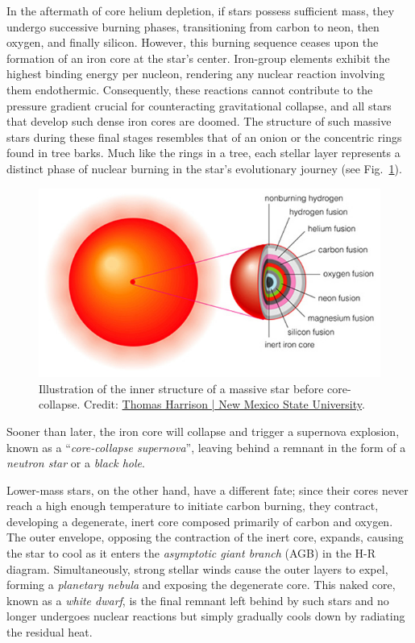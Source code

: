 \documentclass[main.tex]{subfiles}
\begin{document}
    In the aftermath of core helium depletion, if stars possess sufficient mass, they undergo successive burning phases, transitioning from carbon to neon, then oxygen, and finally silicon. However, this burning sequence ceases upon the formation of an iron core at the star's center. Iron-group elements exhibit the highest binding energy per nucleon, rendering any nuclear reaction involving them endothermic. Consequently, these reactions cannot contribute to the pressure gradient crucial for counteracting gravitational collapse, and all stars that develop such dense iron cores are doomed. The structure of such massive stars during these final stages resembles that of an onion or the concentric rings found in tree barks. Much like the rings in a tree, each stellar layer represents a distinct phase of nuclear burning in the star's evolutionary journey (see Fig.~\ref{fig:stellar_structure}).
    \begin{figure}[hb!]
        \centering
        \includegraphics[scale=0.5]{figures/chapter1/high-mass-star-struct.jpeg}
        \caption{Illustration of the inner structure of a massive star before core-collapse. Credit: \href{http://astronomy.nmsu.edu/tharriso/ast110/}{Thomas Harrison | New Mexico State University}.}
        \label{fig:stellar_structure}
    \end{figure}
    Sooner than later, the iron core will collapse and trigger a supernova explosion, known as a ``\textit{core-collapse supernova}'', leaving behind a remnant in the form of a \textit{neutron star} or a \textit{black hole}.
    
    Lower-mass stars, on the other hand, have a different fate; since their cores never reach a high enough temperature to initiate carbon burning, they contract, developing a degenerate, inert core composed primarily of carbon and oxygen. The outer envelope, opposing the contraction of the inert core, expands, causing the star to cool as it enters the \textit{asymptotic giant branch} (AGB) in the H-R diagram.
    Simultaneously, strong stellar winds cause the outer layers to expel, forming a \textit{planetary nebula} and exposing the degenerate core. This naked core, known as a \textit{white dwarf}, is the final remnant left behind by such stars and no longer undergoes nuclear reactions but simply gradually cools down by radiating the residual heat.
\end{document}
